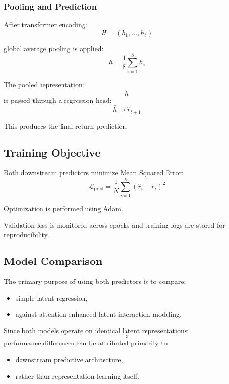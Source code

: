 \documentclass[11pt]{article}
\begin{document}
\subsubsection{Pooling and Prediction}

After transformer encoding:
\[
H
=
(h_1,\dots,h_8)
\]

global average pooling is applied:
\[
\bar h
=
\frac18
\sum_{i=1}^8
h_i
\]

The pooled representation:
\[
\bar h
\]
is passed through a regression head:
\[
\bar h
\rightarrow
\hat r_{t+1}
\]

This produces the final return prediction.

\subsection{Training Objective}

Both downstream predictors minimize Mean Squared Error:
\[
\mathcal{L}_{\text{pred}}
=
\frac1N
\sum_{i=1}^N
(\hat r_i-r_i)^2
\]

Optimization is performed using Adam.

Validation loss is monitored across epochs and training logs are stored for reproducibility.

\subsection{Model Comparison}

The primary purpose of using both predictors is to compare:
\begin{itemize}
    \item simple latent regression,
    \item against attention-enhanced latent interaction modeling.
\end{itemize}

Since both models operate on identical latent representations:
\[
z
\]
performance differences can be attributed primarily to:
\begin{itemize}
    \item downstream predictive architecture,
    \item rather than representation learning itself.
\end{itemize}
\end{document}

